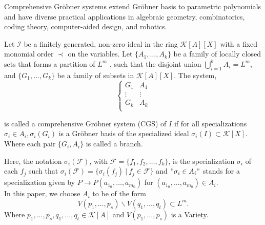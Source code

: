 \documentclass[runningheads]{llncs}
\newcommand{\1}{\chi}
\newcommand{\Ff}{\mathcal{F}}
\newcommand{\Ii}{\mathcal{I}}
\begin{document}
Comprehensive Gr{\"o}bner systems extend Gr{\"o}bner basis to 
parametric polynomials and have diverse practical applications in 
algebraic geometry, combinatorics, coding theory, computer-aided design, and robotics.
\begin{definition}
    Let $\Ii$ be a finitely generated, non-zero ideal in the ring $\mathcal{K}[A][X]$ with a fixed monomial order $\prec$ on the variables. 
    Let $\{A_1,\dots,A_k\}$ be a family of locally closed sets that forms a partition of $L^m$ 
    , such that the disjoint union $\bigcup\limits_{i=1}^k A_i=L^m$, and $\{G_1,\dots,G_k\}$ 
    be a family of subsets in $\mathcal{K}[A][X]$.
    The system, 
	\begin{equation}\label{CGS}
	\left\{
		\begin{array}{ll}
			G_1 & A_1 \\
			\vdots  & \vdots \\ 
			G_k & A_k \\
		\end{array}
		\right. 
	\end{equation}

    is called a comprehensive Gr{\"o}bner system (CGS) of $I$
     if for all specializations $\sigma_i \in A_i, \sigma_i (G_i)$ 
     is a Gr{\"o}bner basis of the specialized ideal $\sigma_i (I)\subset \mathcal{K}[X]$.
     Where each pair $\{G_i,A_i\}$ is called a branch. \cite{Kapur}
\end{definition}
Here, the notation $\sigma_i (\Ff)$, with $\Ff=\{f_1,f_2,\dots ,f_k\}$, is the specialization $\sigma_i$
of each $f_j$ such that  $\sigma_i (\Ff)=\{\sigma_i(f_j)~|~ f_j\in \Ff\}$
and  $"\sigma_i \in A_i"$ stands for a specialization given by $P\rightarrow P(a_{1_0},\dots,a_{m_0})$ 
for $(a_{1_0},\dots,a_{m_0})\in A_i$.\\

In this paper, we choose $A_i$ to be of the form 
$$V(p_1,\dots,p_s)\backslash V(q_1,\dots,q_t) \subset L^m.$$
Where $p_1,\dots,p_s,q_1,\dots,q_t\in \mathcal{K}[A]$ and $V(p_1,\dots,p_s)$ is a Variety.
\end{document}
